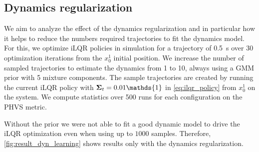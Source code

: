 \subsection{Dynamics regularization}
We aim to analyze the effect of the dynamics regularization and in particular how it helps to reduce the numbers required trajectories to fit the dynamics model. For this, we optimize iLQR policies in simulation for a trajectory of \SI{0.5}{\second} over 30 optimization iterations from the $x^1_0$ initial position. We increase the number of sampled trajectories to estimate the dynamics from 1 to 10, always using a GMM prior with 5 mixture components. The sample trajectories are created by running the current iLQR policy with $\b{\Sigma}_t=0.01\mathds{1}$ in \cref{eq:ilqr_policy} from $x^1_0$ on the system. We compute statistics over 500 runs for each configuration on the PHVS metric.
%

Without the prior we were not able to fit a good dynamic model to drive the iLQR optimization even when using up to $1000$ samples. Therefore, \cref{fig:result_dyn_learning} shows results only with the dynamics regularization.

